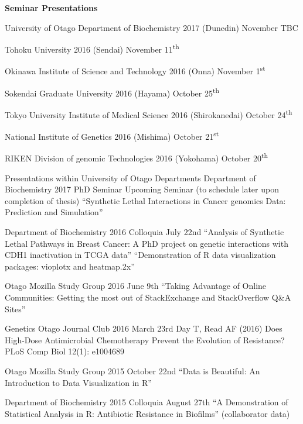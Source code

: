 \clearpage
\textbf{Seminar Presentations}

\begin{small}

University of Otago Department of Biochemistry 2017 (Dunedin) November TBC

Tohoku University 2016 (Sendai) November 11\textsuperscript{th}

Okinawa Institute of Science and Technology 2016 (Onna) November 1\textsuperscript{st}

Sokendai Graduate University 2016 (Hayama) October 25\textsuperscript{th}

Tokyo University Institute of Medical Science 2016 (Shirokanedai) October 24\textsuperscript{th} 

National Institute of Genetics 2016 (Mishima) October 21\textsuperscript{st}

RIKEN Division of \Gls{genomic} Technologies 2016 (Yokohama) October 20\textsuperscript{th}

\end{small}




\iffalse
Presentations within University of Otago Departments
Department of Biochemistry 2017 PhD Seminar
Upcoming Seminar (to schedule later upon completion of thesis)
``Synthetic Lethal Interactions in Cancer \Glspl{genomic} Data: Prediction and Simulation''

Department of Biochemistry 2016 Colloquia July 22nd
``Analysis of Synthetic Lethal Pathways in Breast Cancer: A PhD project on genetic interactions with CDH1 inactivation in \gls{TCGA} data''
``Demonstration of R data visualization packages: vioplotx and heatmap.2x''

Otago Mozilla Study Group 2016 June 9th
``Taking Advantage of Online Communities: Getting the most out of StackExchange and StackOverflow Q&A Sites''

Genetics Otago Journal Club 2016 March 23rd 
Day T, Read AF (2016) Does High-Dose Antimicrobial Chemotherapy Prevent the Evolution of Resistance? PLoS Comp Biol 12(1): e1004689

Otago Mozilla Study Group 2015 October 22nd
``Data is Beautiful: An Introduction to Data Visualization in R''

Department of Biochemistry 2015 Colloquia August 27th
``A Demonstration of Statistical Analysis in R: Antibiotic Resistance in Biofilms'' (collaborator data)

